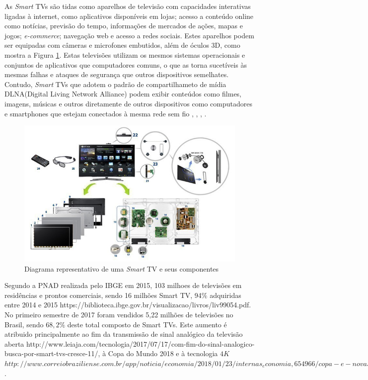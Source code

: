 
As \emph{Smart} TVs são tidas como aparelhos de televisão com capacidades interativas ligadas à internet, como aplicativos disponíveis em lojas; acesso a conteúdo online como notícias, previsão do tempo, informações de mercados de ações, mapas e jogos; \emph{e-commerce}; navegação web e acesso a redes sociais. Estes aparelhos podem ser equipadas com câmeras e microfones embutidos, além de óculos 3D, como mostra a Figura \ref{fig:smart_samsung}. Estas televisões utilizam os mesmos sistemas operacionais e conjuntos de aplicativos que computadores comuns, o que as torna sucetíveis às mesmas falhas e ataques de segurança que outros dispositivos semelhates. Contudo, \emph{Smart} TVs que adotem o padrão de compartilhameto de mídia DLNA(Digital Living Network Alliance) podem exibir conteúdos como filmes, imagens, músicas e outros diretamente de outros dispositivos como computadores e smartphones que estejam conectados à mesma rede sem fio \cite{michele2014watch}, \cite{shin2013smart}, \cite{perakakis2015proposed}, \cite{whatisasmarttv}.
\begin{figure}
	\includegraphics[width=\textwidth]{img/smart_samsung.jpg}
	\caption{Diagrama representativo de uma \emph{Smart} TV e seus componentes \cite{samsung:smarttv}}
	\label{fig:smart_samsung}
\end{figure}

Segundo a PNAD realizada pelo IBGE em 2015, 103 milhoes de televisões em residências e prontos comerciais, sendo 16 milhões Smart TV, 94$\%$ adquiridas entre 2014 e 2015 https://biblioteca.ibge.gov.br/visualizacao/livros/liv99054.pdf. No primeiro semestre de 2017 foram vendidos 5,22 milhões de televisões no Brasil, sendo $68,2\%$ deste total composto de Smart TVs. Este aumento é atribuido principalmente ao fim da transmissão de sinal analógico da televisão aberta http://www.leiaja.com/tecnologia/2017/07/17/com-fim-do-sinal-analogico-busca-por-smart-tvs-cresce-11/, à Copa do Mundo 2018 e à tecnologia $4K$ $http://www.correiobraziliense.com.br/app/noticia/economia/2018/01/23/internas_economia,654966/copa-e-novas-tecnologias-prometem-aumentar-venda-de-tvs-no-brasil.shtml$ .


